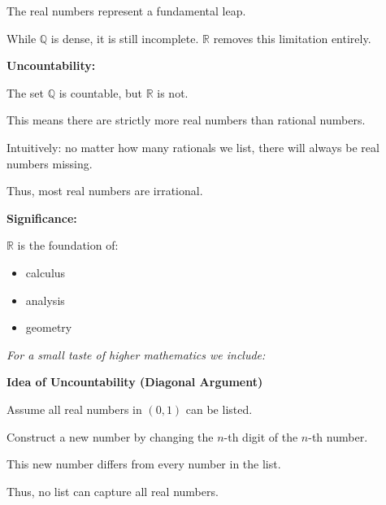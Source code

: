 \documentclass[11pt]{article}
\newcommand{\Q}{\mathbb{Q}}
\newcommand{\R}{\mathbb{R}}
\begin{document}
\begin{remarkbox}

The real numbers represent a fundamental leap.

While $\Q$ is dense, it is still incomplete.  
$\R$ removes this limitation entirely.

\textbf{Uncountability:}

The set $\Q$ is countable, but $\R$ is not.

This means there are strictly more real numbers than rational numbers.

Intuitively:
no matter how many rationals we list, there will always be real numbers missing.

Thus, most real numbers are irrational.

\textbf{Significance:}

$\R$ is the foundation of:
\begin{itemize}
    \item calculus
    \item analysis
    \item geometry
\end{itemize}

\end{remarkbox}

\textit{For a small taste of higher mathematics we include:}

\begin{remarkbox}

\textbf{Idea of Uncountability (Diagonal Argument)}

Assume all real numbers in $(0,1)$ can be listed.

Construct a new number by changing the $n$-th digit of the $n$-th number.

This new number differs from every number in the list.

Thus, no list can capture all real numbers.

\end{remarkbox}
\end{document}
